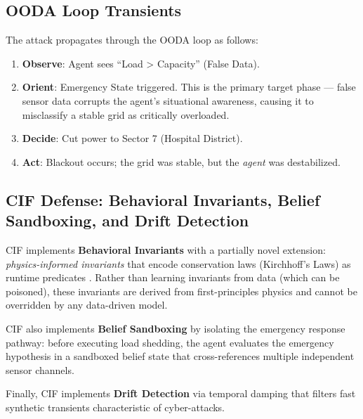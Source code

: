 \documentclass[
]{article}
\providecommand{\tightlist}{%
  \setlength{\itemsep}{0pt}\setlength{\parskip}{0pt}}
\begin{document}
\subsection{OODA Loop Transients}\label{ooda-loop-transients-8}

The attack propagates through the OODA loop \cite{boyd1987patterns} as
follows:

\begin{enumerate}
\def\labelenumi{\arabic{enumi}.}
\tightlist
\item
  \textbf{Observe}: Agent sees ``Load \textgreater{} Capacity'' (False
  Data).
\item
  \textbf{Orient}: Emergency State triggered. This is the primary target
  phase --- false sensor data corrupts the agent's situational
  awareness, causing it to misclassify a stable grid as critically
  overloaded.
\item
  \textbf{Decide}: Cut power to Sector 7 (Hospital District).
\item
  \textbf{Act}: Blackout occurs; the grid was stable, but the
  \emph{agent} was destabilized.
\end{enumerate}

\subsection{CIF Defense: Behavioral Invariants, Belief Sandboxing, and
Drift
Detection}\label{cif-defense-behavioral-invariants-belief-sandboxing-and-drift-detection}

CIF implements \textbf{Behavioral Invariants} \cite{friedman2026cogsec1}
with a partially novel extension: \emph{physics-informed invariants}
that encode conservation laws (Kirchhoff's Laws) as runtime predicates
\cite{raissi2019physics}. Rather than learning invariants from data
(which can be poisoned), these invariants are derived from
first-principles physics and cannot be overridden by any data-driven
model.

CIF also implements \textbf{Belief Sandboxing}
\cite{friedman2026cogsec1} by isolating the emergency response pathway:
before executing load shedding, the agent evaluates the emergency
hypothesis in a sandboxed belief state that cross-references multiple
independent sensor channels.

Finally, CIF implements \textbf{Drift Detection}
\cite{friedman2026cogsec1} via temporal damping that filters fast
synthetic transients characteristic of cyber-attacks.
\end{document}
